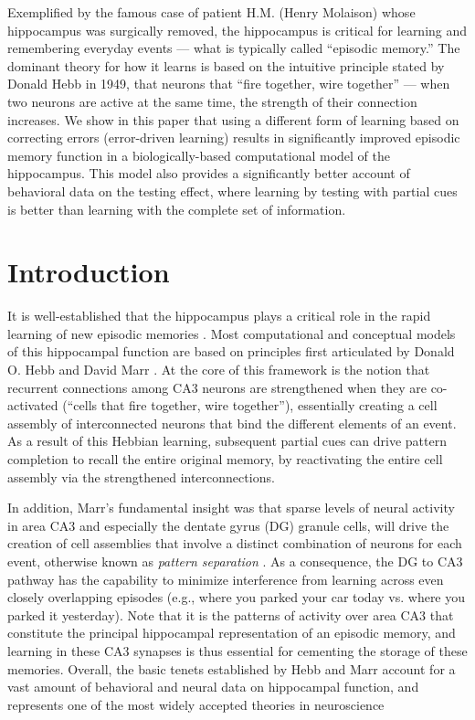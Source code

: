 \documentclass[11pt,twoside]{article}
\newif\myifpdf
\begin{document}
Exemplified by the famous case of patient H.M. (Henry Molaison) whose hippocampus was surgically removed, the hippocampus is critical for learning and remembering everyday events --- what is typically called ``episodic memory.''  The dominant theory for how it learns is based on the intuitive principle stated by Donald Hebb in 1949, that neurons that ``fire together, wire together'' --- when two neurons are active at the same time, the strength of their connection increases.  We show in this paper that using a different form of learning based on correcting errors (error-driven learning) results in significantly improved episodic memory function in a biologically-based computational model of the hippocampus.  This model also provides a significantly better account of behavioral data on the testing effect, where learning by testing with partial cues is better than learning with the complete set of information.

\section{Introduction}

It is well-established that the hippocampus plays a critical role in the rapid learning of new episodic memories \citep{EichenbaumYonelinasRanganath07}.  Most computational and conceptual models of this hippocampal function are based on principles first articulated by Donald O. Hebb and David Marr \citep{Hebb49,Marr71,McNaughtonNadel90,McClellandMcNaughtonOReilly95}.  At the core of this framework is the notion that recurrent connections among CA3 neurons are strengthened when they are co-activated (``cells that fire together, wire together''), essentially creating a cell assembly of interconnected neurons that bind the different elements of an event.  As a result of this Hebbian learning, subsequent partial cues can drive pattern completion to recall the entire original memory, by reactivating the entire cell assembly via the strengthened interconnections.

In addition, Marr's fundamental insight was that sparse levels of neural activity in area CA3 and especially the dentate gyrus (DG) granule cells, will drive the creation of cell assemblies that involve a distinct combination of neurons for each event, otherwise known as \emph{pattern separation} \citep{Marr71,OReillyMcClelland94,YassaStark11}.  As a consequence, the DG to CA3 pathway has the capability to minimize interference from learning across even closely overlapping episodes (e.g., where you parked your car today vs. where you parked it yesterday).  Note that it is the patterns of activity over area CA3 that constitute the principal hippocampal representation of an episodic memory, and learning in these CA3 synapses is thus essential for cementing the storage of these memories.  Overall, the basic tenets established by Hebb and Marr account for a vast amount of behavioral and neural data on hippocampal function, and represents one of the most widely accepted theories in neuroscience \citep{MilnerSquireKandel98,OReillyBhattacharyyaHowardEtAl14,Eichenbaum16,YonelinasRanganathEkstromEtAl19}
 
\end{document}
